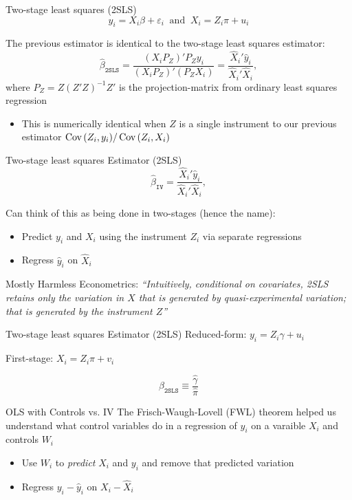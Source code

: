 \documentclass[aspectratio=169,t,11pt,table]{beamer}
\begin{document}
\begin{frame}{Two-stage least squares (2SLS)}
  \vspace{-\bigskipamount}
  $$
    y_i = X_i \beta + \varepsilon_i \ \text{ and }\  X_i = Z_i \pi  + u_i
  $$

  The previous estimator is identical to the two-stage least squares estimator:
  $$
    \hat{\beta}_{\texttt{2SLS}} = \frac{ (X_i P_Z)' P_Z y_i }{ (X_i P_Z)' (P_Z X_i) } = \frac{\hat{X}_i' \hat{y}_i}{\hat{X}_i' \hat{X}_i},
  $$
  where $P_Z = Z (Z'Z)^{-1} Z'$ is the projection-matrix from ordinary least squares regression
  
  \pause
  \begin{itemize}
    \item This is numerically identical when $Z$ is a single instrument to our previous estimator $\cov{Z_i, y_i} / \cov{Z_i, X_i}$
  \end{itemize}
\end{frame}

\begin{frame}{Two-stage least squares Estimator (2SLS)}
  \vspace*{-\bigskipamount}
  $$
    \hat{\beta}_{\texttt{IV}} = \frac{\hat{X}_i' \hat{y}_i}{\hat{X}_i' \hat{X}_i},
  $$

  \bigskip
  Can think of this as being done in two-stages (hence the name):
  \begin{itemize}
    \item Predict $y_i$ and $X_i$ using the instrument $Z_i$ via separate regressions 
    \item Regress $\hat{y}_i$ on $\hat{X}_i$
  \end{itemize}

  \pause
  \bigskip
  Mostly Harmless Econometrics: \emph{``Intuitively, conditional on covariates, 2SLS retains only the variation in $X$ that is generated by quasi-experimental variation; that is generated by the instrument $Z$''}
\end{frame}

\begin{frame}{Two-stage least squares Estimator (2SLS)}
  \alert{Reduced-form:} $y_i = Z_i \gamma + u_i$

  \bigskip
  \alert{First-stage:} $X_i = Z_i \pi + v_i$

  \bigskip
  $$
    \beta_{\texttt{2SLS}} \equiv \frac{\hat{\gamma}}{\hat{\pi}}
  $$
\end{frame}

\begin{frame}{OLS with Controls vs. IV}
  The Frisch-Waugh-Lovell (FWL) theorem helped us understand what control variables do in a regression of $y_i$ on a varaible $X_i$ and controls $W_i$
  \begin{itemize}
    \item Use $W_i$ to \emph{predict} $X_i$ and $y_i$ and remove that predicted variation
    
    \item Regress $y_i - \hat{y}_i$ on $X_i - \hat{X}_i$
  \end{itemize}
\end{frame}
\end{document}
